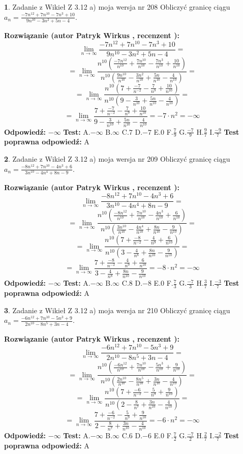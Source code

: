 \documentclass[12pt, a4paper]{article}
\theoremstyle{definition} %
\newtheorem{zad}{}
\newcommand{\zadStart}[1]{\begin{zad}#1\newline}
\newcommand{\zadStop}{\end{zad}}
\newcommand{\rozwStart}[2]{\noindent \textbf{Rozwiązanie (autor #1 , recenzent #2): }\newline}
\newcommand{\rozwStop}{\newline}
\newcommand{\odpStart}{\noindent \textbf{Odpowiedź:}\newline}
\newcommand{\odpStop}{\newline}
\newcommand{\testStart}{\noindent \textbf{Test:}\newline}
\newcommand{\testStop}{\newline}
\newcommand{\kluczStart}{\noindent \textbf{Test poprawna odpowiedź:}\newline}
\newcommand{\kluczStop}{\newline}
\begin{document}
\zadStart{Zadanie z Wikieł Z 3.12 a) moja wersja nr 208}
Obliczyć granicę ciągu $a_{n}=\frac{-7n^{12}+7n^{10}-7n^{3}+10}{9n^{10}-3n^{2}+5n-4}$.
\zadStop
\rozwStart{Patryk Wirkus}{}
$$\lim\limits_{n\to\infty}\frac{-7n^{12}+7n^{10}-7n^{3}+10}{9n^{10}-3n^{2}+5n-4}=$$
$$=\lim\limits_{n\to\infty}\frac{n^{10}\left(\frac{-7n^{12}}{n^{10}}+\frac{7n^{10}}{n^{10}}-\frac{7n^{3}}{n^{10}}+\frac{10}{n^{10}}\right)}{n^{10}\left(\frac{9n^{10}}{n^{10}}-\frac{3n^{2}}{n^{10}}+\frac{5n}{n^{10}}-\frac{4}{n^{10}}\right)}=$$
$$=\lim\limits_{n\to\infty}\frac{n^{10}\left(7+\frac{-7}{n^{-2}}-\frac{7}{n^{9}}+\frac{10}{n^{10}}\right)}
{n^{10}\left(9-\frac{3}{n^{10}}+\frac{5n}{n^{10}}-\frac{4}{n^{10}}\right)}=$$
$$=\lim\limits_{n\to\infty}\frac{7+\frac{-7}{n^{-2}}-\frac{7}{n^{9}}+\frac{10}{n^{10}}}{9-\frac{3}{n^{10}}+\frac{5n}{n^{10}}-\frac{4}{n^{10}}}=-7\cdot n^{2} = -\infty$$
\rozwStop
\odpStart
$-\infty$
\odpStop
\testStart
A.$-\infty$
B.$\infty$
C.$7$
D.$-7$
E.$0$
F.$\frac{7}{9}$
G.$\frac{-7}{9}$
H.$\frac{9}{7}$
I.$\frac{-9}{7}$
\testStop
\kluczStart
A
\kluczStop



\zadStart{Zadanie z Wikieł Z 3.12 a) moja wersja nr 209}
Obliczyć granicę ciągu $a_{n}=\frac{-8n^{12}+7n^{10}-4n^{3}+6}{3n^{10}-4n^{4}+8n-9}$.
\zadStop
\rozwStart{Patryk Wirkus}{}
$$\lim\limits_{n\to\infty}\frac{-8n^{12}+7n^{10}-4n^{3}+6}{3n^{10}-4n^{4}+8n-9}=$$
$$=\lim\limits_{n\to\infty}\frac{n^{10}\left(\frac{-8n^{12}}{n^{10}}+\frac{7n^{10}}{n^{10}}-\frac{4n^{3}}{n^{10}}+\frac{6}{n^{10}}\right)}{n^{10}\left(\frac{3n^{10}}{n^{10}}-\frac{4n^{4}}{n^{10}}+\frac{8n}{n^{10}}-\frac{9}{n^{10}}\right)}=$$
$$=\lim\limits_{n\to\infty}\frac{n^{10}\left(7+\frac{-8}{n^{-2}}-\frac{4}{n^{9}}+\frac{6}{n^{10}}\right)}
{n^{10}\left(3-\frac{4}{n^{8}}+\frac{8n}{n^{10}}-\frac{9}{n^{10}}\right)}=$$
$$=\lim\limits_{n\to\infty}\frac{7+\frac{-8}{n^{-2}}-\frac{4}{n^{9}}+\frac{6}{n^{10}}}{3-\frac{4}{n^{8}}+\frac{8n}{n^{10}}-\frac{9}{n^{10}}}=-8\cdot n^{2} = -\infty$$
\rozwStop
\odpStart
$-\infty$
\odpStop
\testStart
A.$-\infty$
B.$\infty$
C.$8$
D.$-8$
E.$0$
F.$\frac{7}{3}$
G.$\frac{-7}{3}$
H.$\frac{3}{7}$
I.$\frac{-3}{7}$
\testStop
\kluczStart
A
\kluczStop



\zadStart{Zadanie z Wikieł Z 3.12 a) moja wersja nr 210}
Obliczyć granicę ciągu $a_{n}=\frac{-6n^{12}+7n^{10}-5n^{3}+9}{2n^{10}-8n^{5}+3n-4}$.
\zadStop
\rozwStart{Patryk Wirkus}{}
$$\lim\limits_{n\to\infty}\frac{-6n^{12}+7n^{10}-5n^{3}+9}{2n^{10}-8n^{5}+3n-4}=$$
$$=\lim\limits_{n\to\infty}\frac{n^{10}\left(\frac{-6n^{12}}{n^{10}}+\frac{7n^{10}}{n^{10}}-\frac{5n^{3}}{n^{10}}+\frac{9}{n^{10}}\right)}{n^{10}\left(\frac{2n^{10}}{n^{10}}-\frac{8n^{5}}{n^{10}}+\frac{3n}{n^{10}}-\frac{4}{n^{10}}\right)}=$$
$$=\lim\limits_{n\to\infty}\frac{n^{10}\left(7+\frac{-6}{n^{-2}}-\frac{5}{n^{9}}+\frac{9}{n^{10}}\right)}
{n^{10}\left(2-\frac{8}{n^{7}}+\frac{3n}{n^{10}}-\frac{4}{n^{10}}\right)}=$$
$$=\lim\limits_{n\to\infty}\frac{7+\frac{-6}{n^{-2}}-\frac{5}{n^{9}}+\frac{9}{n^{10}}}{2-\frac{8}{n^{7}}+\frac{3n}{n^{10}}-\frac{4}{n^{10}}}=-6\cdot n^{2} = -\infty$$
\rozwStop
\odpStart
$-\infty$
\odpStop
\testStart
A.$-\infty$
B.$\infty$
C.$6$
D.$-6$
E.$0$
F.$\frac{7}{2}$
G.$\frac{-7}{2}$
H.$\frac{2}{7}$
I.$\frac{-2}{7}$
\testStop
\kluczStart
A
\kluczStop
\end{document}
